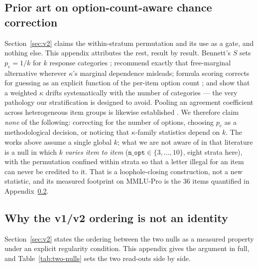 
\subsection{Prior art on option-count-aware chance correction}
\label{app:priorart}

Section~\ref{sec:v2} claims the within-stratum permutation and its use as a gate, and nothing else. This appendix attributes the rest, result by result. Bennett's $S$ sets $p_e=1/k$ for $k$ response categories \citep{bennett1954communications}; \citet{brennan1981kappa} recommend exactly that free-marginal alternative wherever $\kappa$'s marginal dependence misleads; formula scoring corrects for guessing as an explicit function of the per-item option count \citep{frary1988formula}; and \citet{brenner1996weightedkappa} show that a weighted $\kappa$ drifts systematically with the number of categories --- the very pathology our stratification is designed to avoid. Pooling an agreement coefficient across heterogeneous item groups is likewise established \citep{devries2008pooledkappa}. We therefore claim \emph{none} of the following: correcting for the number of options, choosing $p_e$ as a methodological decision, or noticing that $\kappa$-family statistics depend on $k$. The works above assume a single global $k$; what we are not aware of in that literature is a null in which $k$ \emph{varies item to item} ($\texttt{n\_opt}\in\{3,\dots,10\}$, eight strata here), with the permutation confined within strata so that a letter illegal for an item can never be credited to it. That is a loophole-closing construction, not a new statistic, and its measured footprint on MMLU-Pro is the $36$ items quantified in Appendix~\ref{app:ordering}.

\subsection{Why the v1/v2 ordering is not an identity}
\label{app:ordering}

Section~\ref{sec:v2} states the ordering between the two nulls as a measured property under an explicit regularity condition. This appendix gives the argument in full, and Table~\ref{tab:two-nulls} sets the two read-outs side by side.

